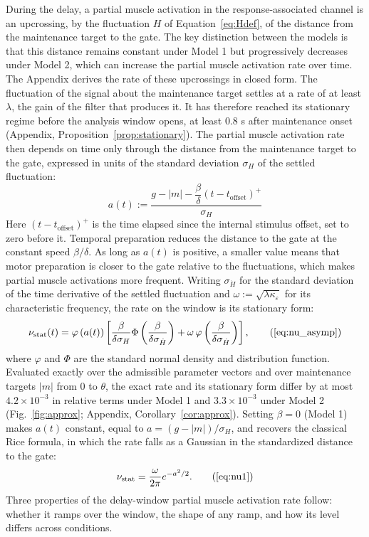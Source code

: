 \documentclass[a4paper,11pt]{article}
\theoremstyle{definition}
\newcommand{\nustat}{{\nu }_{\mathrm{stat}}}
\newcommand{\1}{\mathbbm{1}}
\begin{document}
During the delay, a partial muscle activation in the response-associated channel is an upcrossing, by the fluctuation $H$ of Equation~\eqref{eq:Hdef}, of the distance from the maintenance target to the gate. The key distinction between the models is that this distance remains constant under Model 1 but progressively decreases under Model 2, which can increase the partial muscle activation rate over time. The Appendix derives the rate of these upcrossings in closed form. The fluctuation of the signal about the maintenance target settles at a rate of at least $\lambda$, the gain of the filter that produces it. It has therefore reached its stationary regime before the analysis window opens, at least 0.8 s after maintenance onset (Appendix, Proposition~\ref{prop:stationary}). The partial muscle activation rate then depends on time only through the distance from the maintenance target to the gate, expressed in units of the standard deviation $\sigma_{H}$ of the settled fluctuation:
\begin{equation}
a(t):=\frac{g-|m|-\dfrac{\beta}{\delta}\left(t-t_{\mathrm{offset}}\right)^{+}}{\sigma_{H}}
\label{eq:a}
\end{equation}
Here $(t-t_{\mathrm{offset}})^{+}$ is the time elapsed since the internal stimulus offset, set to zero before it. Temporal preparation reduces the distance to the gate at the constant speed $\beta/\delta$. As long as $a(t)$ is positive, a smaller value means that motor preparation is closer to the gate relative to the fluctuations, which makes partial muscle activations more frequent. Writing $\sigma_{\dot{H}}$ for the standard deviation of the time derivative of the settled fluctuation and $\omega:=\sqrt{\lambda\kappa_{\varepsilon}}$ for its characteristic frequency, the rate on the window is its stationary form:
\begin{equation*}
\nustat(t)=\varphi\left(a(t)\right)\left[\frac{\beta}{\delta\sigma_{H}}\Phi\left(\frac{\beta}{\delta\sigma_{\dot{H}}}\right)+\omega\,\varphi\left(\frac{\beta}{\delta\sigma_{\dot{H}}}\right)\right],
\tag{\ref{eq:nu_asymp}}
\end{equation*}
where $\varphi$ and $\Phi$ are the standard normal density and distribution function. Evaluated exactly over the admissible parameter vectors and over maintenance targets $|m|$ from 0 to $\theta$, the exact rate and its stationary form differ by at most $4.2\times10^{-3}$ in relative terms under Model 1 and $3.3\times10^{-3}$ under Model 2 (Fig.~\ref{fig:approx}; Appendix, Corollary~\ref{cor:approx}). Setting $\beta=0$ (Model 1) makes $a(t)$ constant, equal to $a=(g-|m|)/\sigma_{H}$, and recovers the classical Rice formula, in which the rate falls as a Gaussian in the standardized distance to the gate:
\begin{equation*}
\nustat=\frac{\omega}{2\pi}e^{-a^{2}/2}.
\tag{\ref{eq:nu1}}
\end{equation*}
Three properties of the delay-window partial muscle activation rate follow: whether it ramps over the window, the shape of any ramp, and how its level differs across conditions.
\end{document}
